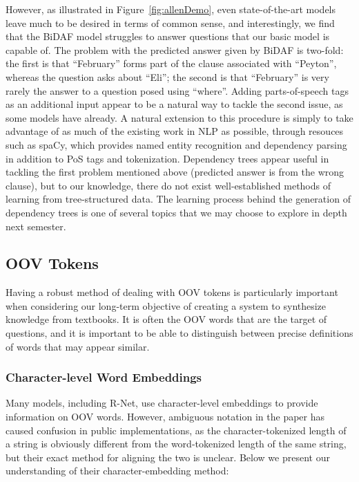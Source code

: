 \documentclass{article}
\begin{document}
However, as illustrated in Figure~\ref{fig:allenDemo}, even state-of-the-art models leave much to be desired in terms of common sense, and interestingly, we find that the BiDAF model struggles to answer questions that our basic model is capable of. The problem with the predicted answer given by BiDAF is two-fold: the first is that ``February'' forms part of the clause associated with ``Peyton'', whereas the question asks about ``Eli''; the second is that ``February'' is very rarely the answer to a question posed using ``where''. Adding parts-of-speech tags as an additional input appear to be a natural way to tackle the second issue, as some models have already. A natural extension to this procedure is simply to take advantage of as much of the existing work in NLP as possible, through resouces such as spaCy\footnotemark{}, which provides named entity recognition and dependency parsing in addition to PoS tags and tokenization. Dependency trees appear useful in tackling the first problem mentioned above (predicted answer is from the wrong clause), but to our knowledge, there do not exist well-established methods of learning from tree-structured data. The learning process behind the generation of dependency trees is one of several topics that we may choose to explore in depth next semester.

\subsection{OOV Tokens}
Having a robust method of dealing with OOV tokens is particularly important when considering our long-term objective of creating a system to synthesize knowledge from textbooks. It is often the OOV words that are the target of questions, and it is important to be able to distinguish between precise definitions of words that may appear similar.

\subsubsection{Character-level Word Embeddings}
Many models, including R-Net, use character-level embeddings to provide information on OOV words. However, ambiguous notation in the paper has caused confusion in public implementations, as the character-tokenized length of a string is obviously different from the word-tokenized length of the same string, but their exact method for aligning the two is unclear. Below we present our understanding of their character-embedding method:
\end{document}

